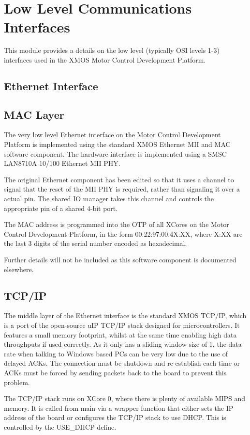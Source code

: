 \section{Low Level Communications Interfaces}
This module provides a details on the low level (typically OSI levels 1-3) interfaces used in the XMOS Motor Control Development Platform.

\subsection{Ethernet Interface}

\subsection{MAC Layer}
The very low level Ethernet interface on the Motor Control Development Platform is implemented using the standard XMOS Ethernet MII and MAC software component.
The hardware interface is implemented using a SMSC LAN8710A 10/100 Ethernet MII PHY.

The original Ethernet component has been edited so that it uses a channel to signal that the reset of the MII PHY is required, rather than signaling it over a actual pin.
The shared IO manager takes this channel and controls the appropriate pin of a shared 4-bit port.

The MAC address is programmed into the OTP of all XCores on the Motor Control Development Platform, in the form 00:22:97:00:4X:XX, where X:XX are the last 3 digits of the serial number encoded as hexadecimal.

Further details will not be included as this software component is documented elsewhere.


\subsection{TCP/IP}

The middle layer of the Ethernet interface is the standard XMOS TCP/IP, which is a port of the open-source uIP TCP/IP stack designed for microcontrollers.
It features a small memory footprint, whilst at the same time enabling high data throughputs if used correctly.
As it only has a sliding window size of 1, the data rate when talking to Windows based PCs can be very low due to the use of delayed ACKs.
The connection must be shutdown and re-establish each time or ACKs must be forced by sending packets back to the board to prevent this problem.

The TCP/IP stack runs on XCore 0, where there is plenty of available MIPS and memory.
It is called from main via a wrapper function that either sets the IP address of the board or configures the TCP/IP stack to use DHCP.
This is controlled by the USE\_DHCP define.


